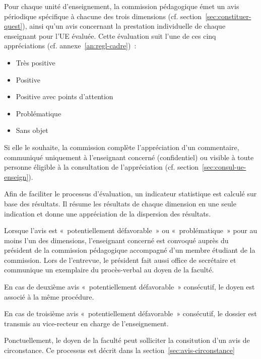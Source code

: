 \documentclass[a4paper,11pt]{report}
\begin{document}
Pour chaque unité d'enseignement, la commission pédagogique émet un avis périodique spécifique à chacune des trois dimensions (cf. section~\ref{sec:constituer-quest}), ainsi qu'un avis concernant la prestation individuelle de chaque enseignant pour l'UE évaluée.
Cette évaluation suit l'une de ces cinq appréciations (cf. annexe~\ref{an:regl-cadre})~:
\begin{itemize}
	\item Très positive
	\item Positive
	\item Positive avec points d'attention
	\item Problématique
	\item Sans objet
\end{itemize}
Si elle le souhaite, la commission complète l'appréciation d'un commentaire, communiqué uniquement à l'enseignant concerné (confidentiel) ou visible à toute personne éligible à la consultation de l'appréciation (cf. section~\ref{sec:consul-ue-enseign}).

Afin de faciliter le processus d'évaluation, un indicateur statistique est calculé sur base des résultats.
Il résume les résultats de chaque dimension en une seule indication et donne une appréciation de la dispersion des résultats.\newline{}

Lorsque l'avis est «~potentiellement défavorable~» ou «~problématique~» pour au moins l'un des dimensions, l'enseignant concerné est convoqué auprès du président de la commission pédagogique accompagné d'un membre étudiant de la commission.
Lors de l'entrevue, le président fait aussi office de secrétaire et communique un exemplaire du procès-verbal au doyen de la faculté.

En cas de deuxième avis «~potentiellement défavorable~» consécutif, le doyen est associé à la même procédure.

En cas de troisième avis «~potentiellement défavorable~» consécutif, le dossier est transmis au vice-recteur en charge de l'enseignement.\newline{}

Ponctuellement, le doyen de la faculté peut solliciter la consitution d'un avis de circonstance.
Ce processus est décrit dans la section~\ref{sec:avis-circonstance}








\end{document}
